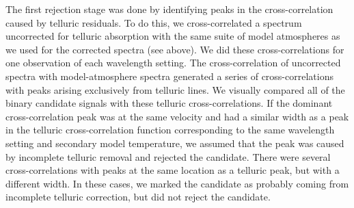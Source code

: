 The first rejection stage was done by identifying peaks in the
cross-correlation caused by telluric residuals. To do this, we
cross-correlated a spectrum uncorrected for telluric absorption with
the same suite of model atmospheres as we used for the corrected
spectra (see above). We did these cross-correlations for one observation of each wavelength
setting. The cross-correlation of uncorrected spectra with model-atmosphere spectra generated a series of cross-correlations with peaks
arising exclusively from telluric lines. We visually compared all
of the binary candidate signals with these telluric
cross-correlations. If the dominant cross-correlation peak was at the
same velocity and had a similar width as a peak in the telluric
cross-correlation function corresponding to the same wavelength
setting and secondary model temperature, we assumed that the peak was caused by incomplete
telluric removal and rejected the candidate. There were several
cross-correlations with peaks at the same location as a telluric peak,
but with a different width. In these cases, we marked the candidate as
probably coming from incomplete telluric correction, but did not
reject the candidate.



